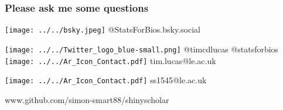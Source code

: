 \documentclass[handout, aspectratio = 169, xcolor={dvipsnames}]{beamer}
\begin{document}
    
\begin{frame}

\frametitle{Please ask me some questions}


\texttt{[image: ../../bsky.jpeg]}{\color{black}  \hspace{0.6mm}\footnotesize{@}\small{StatsForBios.bsky.social}}
\vspace{0.5cm}

\texttt{[image: ../../Twitter\_logo\_blue-small.png]}{\color{black} \hspace{0.6mm}\footnotesize{@}\small{timcdlucas}  \footnotesize{@}\small{statsforbios}}\\

\texttt{[image: ../../Ar\_Icon\_Contact.pdf]}{\color{black}  \hspace{0.6mm}\small{tim.lucas}\footnotesize{@}\small{le.ac.uk}}


\texttt{[image: ../../Ar\_Icon\_Contact.pdf]}{\color{black}  \hspace{0.6mm}\small{ss1545}\footnotesize{@}\small{le.ac.uk}}

\vspace{2cm}

www.github.com/simon-smart88/shinyscholar


\hfill %

\end{frame}







\end{document}
